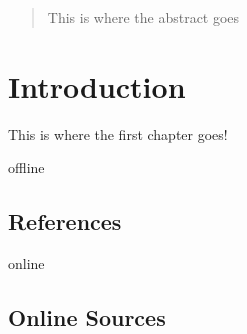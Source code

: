 \documentclass[12pt,a4paper]{report}
\begin{document}


\begin{abstract}
This is where the abstract goes
\end{abstract}

\tableofcontents

\chapter{Introduction} \label{chap:intro}

This is where the first chapter goes!

\newpage


\begin{btSect}{offline} %
\section*{References}
\btPrintCited
\end{btSect}
\begin{btSect}{online}
\section*{Online Sources}
\btPrintCited
\end{btSect}
\end{document}
